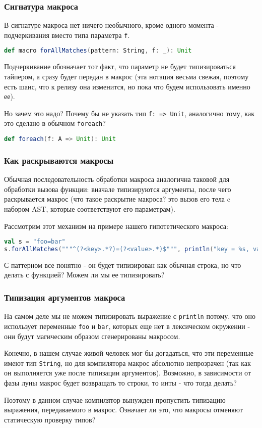 \documentclass[hyperref={bookmarks=false}]{beamer}
\begin{document}
\begin{frame}[t,fragile]
\frametitle{Сигнатура макроса}

В сигнатуре макроса нет ничего необычного, кроме одного момента - подчеркивания вместо типа параметра \texttt{f}.

\begin{lstlisting}[language=scala]
def macro forAllMatches(pattern: String, f: _): Unit
\end{lstlisting}

Подчеркивание обозначает тот факт, что параметр не будет типизироваться тайпером, а сразу будет передан в макрос (эта нотация весьма свежая, поэтому есть шанс, что к релизу она изменится, но пока что будем использовать именно ее).

Но зачем это надо? Почему бы не указать тип \texttt{f: => Unit}, аналогично тому, как это сделано в обычном \texttt{foreach}?

\begin{lstlisting}[language=scala]
def foreach(f: A => Unit): Unit
\end{lstlisting}
\end{frame}

\begin{frame}[t,fragile]
\frametitle{Как раскрываются макросы}

Обычная последовательность обработки макроса аналогична таковой для обработки вызова функции: вначале типизируются аргументы, после чего раскрывается макрос (что такое раскрытие макроса? это вызов его тела c набором AST, которые соответствуют его параметрам).

Рассмотрим этот механизм на примере нашего гипотетического макроса:

\begin{lstlisting}[language=scala]
val s = "foo=bar"
s.forAllMatches("""^(?<key>.*?)=(?<value>.*)$""", println("key = %s, value = %s".format(key, value)))
\end{lstlisting}%

С паттерном все понятно - он будет типизирован как обычная строка, но что делать с функцией? Можем ли мы ее типизировать?
\end{frame}

\begin{frame}[t,fragile]
\frametitle{Типизация аргументов макроса}

На самом деле мы не можем типизировать выражение с \texttt{println} потому, что оно использует переменные \texttt{foo} и \texttt{bar}, которых еще нет в лексическом окружении - они будут магическим образом сгенерированы макросом.

Конечно, в нашем случае живой человек мог бы догадаться, что эти переменные имеют тип \texttt{String}, но для компилятора макрос абсолютно непрозрачен (так как он выполняется уже после типизации аргументов). Возможно, в зависимости от фазы луны макрос будет возвращать то строки, то инты  - что тогда делать?

Поэтому в данном случае компилятор вынужден пропустить типизацию выражения, передаваемого в макрос. Означает ли это, что макросы отменяют статическую проверку типов?
\end{frame}
\end{document}
